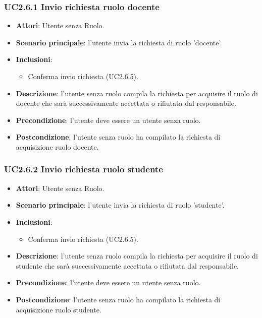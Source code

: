 \subsubsection{UC2.6.1 Invio richiesta ruolo docente}
\begin{itemize}
\item \textbf{Attori}: Utente senza Ruolo.
\item \textbf{Scenario principale}: l'utente invia la richiesta di ruolo 'docente'.
\item \textbf{Inclusioni}:
\begin{itemize}
\item Conferma invio richiesta (UC2.6.5).
\end{itemize}
\item \textbf{Descrizione}: l'utente senza ruolo compila la richiesta per acquisire il ruolo di docente che sarà successivamente accettata  o rifiutata dal responsabile.
\item \textbf{Precondizione}: l'utente deve essere un utente senza ruolo.
\item \textbf{Postcondizione}: l'utente senza ruolo ha compilato la richiesta di acquisizione ruolo docente.
\end{itemize}
\subsubsection{UC2.6.2 Invio richiesta ruolo studente}
\begin{itemize}
\item \textbf{Attori}: Utente senza Ruolo.
\item \textbf{Scenario principale}: l'utente invia la richiesta di ruolo 'studente'.
\item \textbf{Inclusioni}:
\begin{itemize}
\item Conferma invio richiesta (UC2.6.5).
\end{itemize}
\item \textbf{Descrizione}: l'utente senza ruolo compila la richiesta per acquisire il ruolo di studente che sarà successivamente accettata o rifiutata dal responsabile.
\item \textbf{Precondizione}: l'utente deve essere un utente senza ruolo.
\item \textbf{Postcondizione}: l'utente senza ruolo ha compilato la richiesta di acquisizione ruolo studente.
\end{itemize}
